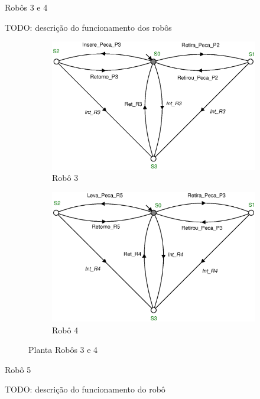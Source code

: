 Robôs 3 e 4

TODO: descrição do funcionamento dos robôs

\begin{figure}[H]%
  \centering
  \begin{subfigure}[b]{0.45\textwidth}
      \centering
      \includegraphics[width=\textwidth]{imagens/Robo_3.eps}
      \caption{Robô 3}
      \label{fig:r3}
  \end{subfigure}
  \hfill
  \begin{subfigure}[b]{0.45\textwidth}
      \centering
      \includegraphics[width=\textwidth]{imagens/Robo_4.eps}
      \caption{Robô 4}
      \label{fig:r4}
  \end{subfigure}
  \caption{Planta Robôs 3 e 4}
  \label{fig:robo34}
\end{figure}

Robô 5

TODO: descrição do funcionamento do robô

